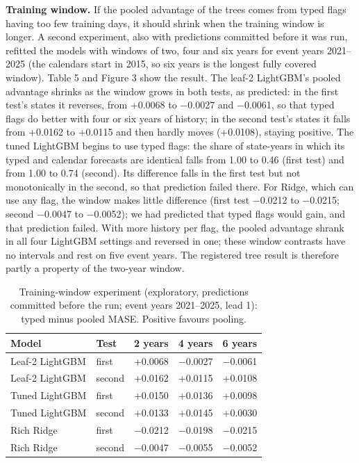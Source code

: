 \documentclass[review,12pt,authoryear]{elsarticle}
\begin{document}
\textbf{Training window.} If the pooled advantage of the trees comes from typed flags having too few training days, it should shrink when the training window is longer. A second experiment, also with predictions committed before it was run, refitted the models with windows of two, four and six years for event years 2021--2025 (the calendars start in 2015, so six years is the longest fully covered window). Table 5 and Figure 3 show the result. The leaf-2 LightGBM's pooled advantage shrinks as the window grows in both tests, as predicted: in the first test's states it reverses, from +0.0068 to −0.0027 and −0.0061, so that typed flags do better with four or six years of history; in the second test's states it falls from +0.0162 to +0.0115 and then hardly moves (+0.0108), staying positive. The tuned LightGBM begins to use typed flags: the share of state-years in which its typed and calendar forecasts are identical falls from 1.00 to 0.46 (first test) and from 1.00 to 0.74 (second). Its difference falls in the first test but not monotonically in the second, so that prediction failed there. For Ridge, which can use any flag, the window makes little difference (first test −0.0212 to −0.0215; second −0.0047 to −0.0052); we had predicted that typed flags would gain, and that prediction failed. With more history per flag, the pooled advantage shrank in all four LightGBM settings and reversed in one; these window contrasts have no intervals and rest on five event years. The registered tree result is therefore partly a property of the two-year window.

\begin{table}[htbp]
\centering
\def\baselinestretch{1}\footnotesize
\caption{Training-window experiment (exploratory, predictions committed before the run; event years 2021–2025, lead 1): typed minus pooled MASE. Positive favours pooling.}
\label{tab:5}
\begin{tabularx}{\textwidth}{>{\raggedright\arraybackslash}Xllll}
\toprule
Model & Test & 2 years & 4 years & 6 years \\
\midrule
Leaf-2 LightGBM & first & +0.0068 & −0.0027 & −0.0061 \\
Leaf-2 LightGBM & second & +0.0162 & +0.0115 & +0.0108 \\
Tuned LightGBM & first & +0.0150 & +0.0136 & +0.0098 \\
Tuned LightGBM & second & +0.0133 & +0.0145 & +0.0030 \\
Rich Ridge & first & −0.0212 & −0.0198 & −0.0215 \\
Rich Ridge & second & −0.0047 & −0.0055 & −0.0052 \\
\bottomrule
\end{tabularx}
\end{table}
\end{document}
